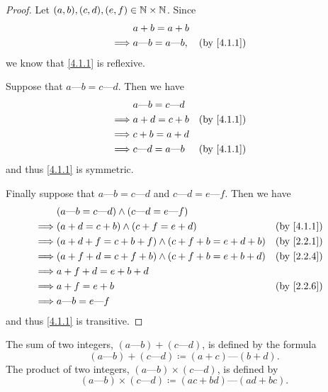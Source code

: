 \begin{proof}
  Let \((a, b), (c, d), (e, f) \in \mathbb{N} \times \mathbb{N}\).
  Since
  \begin{align*}
             & a + b = a + b                                                  \\
    \implies & a \text{---} b = a \text{---} b, &  & \text{(by \cref{4.1.1})}
  \end{align*}
  we know that \cref{4.1.1} is reflexive.

  Suppose that \(a \text{---} b = c \text{---} d\).
  Then we have
  \begin{align*}
             & a \text{---} b = c \text{---} d                               \\
    \implies & a + d = c + b                   &  & \text{(by \cref{4.1.1})} \\
    \implies & c + b = a + d                                                 \\
    \implies & c \text{---} d = a \text{---} b &  & \text{(by \cref{4.1.1})}
  \end{align*}
  and thus \cref{4.1.1} is symmetric.

  Finally suppose that \(a \text{---} b = c \text{---} d\) and \(c \text{---} d = e \text{---} f\).
  Then we have
  \begin{align*}
             & (a \text{---} b = c \text{---} d) \land (c \text{---} d = e \text{---} f)                               \\
    \implies & (a + d = c + b) \land (c + f = e + d)                                     &  & \text{(by \cref{4.1.1})} \\
    \implies & (a + d + f = c + b + f) \land (c + f + b = e + d + b)                     &  & \text{(by \cref{2.2.1})} \\
    \implies & (a + f + d = c + f + b) \land (c + f + b = e + b + d)                     &  & \text{(by \cref{2.2.4})} \\
    \implies & a + f + d = e + b + d                                                                                   \\
    \implies & a + f = e + b                                                             &  & \text{(by \cref{2.2.6})} \\
    \implies & a \text{---} b = e \text{---} f
  \end{align*}
  and thus \cref{4.1.1} is transitive.
\end{proof}

\begin{defn}\label{4.1.2}
  The sum of two integers, \((a \text{---} b) + (c \text{---} d)\), is defined by the formula
  \[
    (a \text{---} b) + (c \text{---} d) \coloneqq (a + c) \text{---} (b + d).
  \]
  The product of two integers, \((a \text{---} b) \times (c \text{---} d)\), is defined by
  \[
    (a \text{---} b) \times (c \text{---} d) \coloneqq (ac + bd) \text{---} (ad + bc).
  \]
\end{defn}

